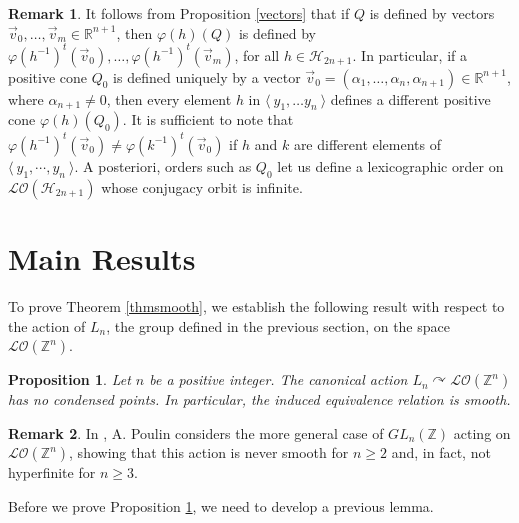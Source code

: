 \documentclass[12pt]{article}
\newtheorem{prop}{Proposition}
\theoremstyle{definition}
\newtheorem{rem}{Remark}
\begin{document}
\begin{rem}
It follows from Proposition \ref{vectors} that if $Q$ is defined by vectors $\vec{v}_0,\dots,\vec{v}_m\in\mathbb{R}^{n+1}$, then $\varphi(h)(Q)$ is defined by $\varphi(h^{-1})^t(\vec{v}_0),\dots, \varphi(h^{-1})^t(\vec{v}_m)$, for all $h\in \mathcal{H}_{2n+1}$. In particular, if a positive cone $Q_0$ is defined uniquely by a vector $\vec{v}_0=(\alpha_1,\dots,\alpha_{n},\alpha_{n+1})\in \mathbb{R}^{n+1}$, where $\alpha_{n+1}\neq 0$, then every element $h$ in $\langle\ y_1,\dots y_n\ \rangle$ defines a different positive cone $\varphi(h)(Q_0)$. It is sufficient to note that $\varphi(h^{-1})^t(\vec{v}_0)\neq \varphi(k^{-1})^t(\vec{v}_0)$ if $h$ and $k$ are different elements of $\langle\ y_1,\dotsm ,y_n\ \rangle$. A posteriori, orders such as $Q_0$ let us define a lexicographic order on $\mathcal{LO}(\mathcal{H}_{2n+1})$ whose conjugacy orbit is infinite.
\end{rem}

\section{Main Results}

To prove Theorem \ref{thmsmooth}, we establish the following result with respect to the action of $L_n$, the group defined in the previous section, on the space $\mathcal{LO}(\mathbb{Z}^n)$.

\begin{prop}
\label{matrixact}
    Let $n$ be a positive integer. The canonical action $L_n\curvearrowright \mathcal{LO}(\mathbb{Z}^n)$ has no condensed points. In particular, the induced equivalence relation is smooth.
\end{prop}

\begin{rem}
In \cite{Poulin}, A. Poulin considers the more general case of $GL_n(\mathbb{Z})$ acting on $\mathcal{LO}(\mathbb{Z}^n)$, showing that this action is never smooth for $n\geq 2$ and, in fact, not hyperfinite for $n\geq 3$.   
\end{rem}

Before we prove Proposition \ref{matrixact}, we need to develop a previous lemma.
\end{document}
